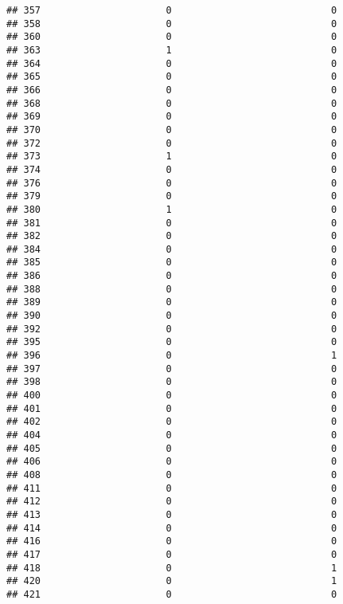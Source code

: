\documentclass[
]{article}
\begin{document}
\begin{verbatim}
## 357                      0                            0
## 358                      0                            0
## 360                      0                            0
## 363                      1                            0
## 364                      0                            0
## 365                      0                            0
## 366                      0                            0
## 368                      0                            0
## 369                      0                            0
## 370                      0                            0
## 372                      0                            0
## 373                      1                            0
## 374                      0                            0
## 376                      0                            0
## 379                      0                            0
## 380                      1                            0
## 381                      0                            0
## 382                      0                            0
## 384                      0                            0
## 385                      0                            0
## 386                      0                            0
## 388                      0                            0
## 389                      0                            0
## 390                      0                            0
## 392                      0                            0
## 395                      0                            0
## 396                      0                            1
## 397                      0                            0
## 398                      0                            0
## 400                      0                            0
## 401                      0                            0
## 402                      0                            0
## 404                      0                            0
## 405                      0                            0
## 406                      0                            0
## 408                      0                            0
## 411                      0                            0
## 412                      0                            0
## 413                      0                            0
## 414                      0                            0
## 416                      0                            0
## 417                      0                            0
## 418                      0                            1
## 420                      0                            1
## 421                      0                            0

\end{verbatim}
\end{document}
